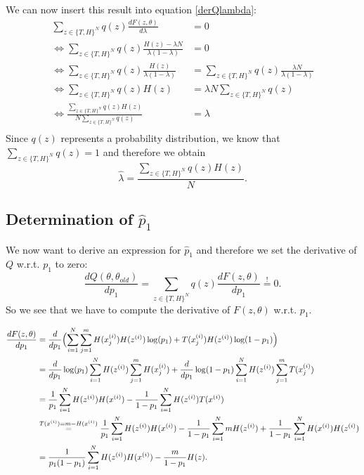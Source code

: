 \documentclass[paper=a4,fontsize=10pt,DIV11,BCOR10mm]{scrartcl}
\begin{document}
We can now insert this result into equation \ref{derQlambda}:
\begin{align*}
\sum_{z\in \{T,H\}^N} q(z) \frac{dF(z,\theta)}{d\lambda} &=0\\
\Leftrightarrow \sum_{z\in \{T,H\}^N} q(z) \frac{H(z)-\lambda N}{\lambda(1-\lambda)} &=0\\
\Leftrightarrow \sum_{z\in \{T,H\}^N} q(z) \frac{H(z)}{\lambda(1-\lambda)} &= \sum_{z\in \{T,H\}^N} q(z) \frac{\lambda N}{\lambda(1-\lambda)}\\
\Leftrightarrow \sum_{z\in \{T,H\}^N} q(z) H(z) &= \lambda N \sum_{z\in \{T,H\}^N} q(z) \\
\Leftrightarrow \frac{\sum_{z\in \{T,H\}^N} q(z) H(z)}{N \sum_{z\in \{T,H\}^N} q(z)} &= \lambda\\
\end{align*}
Since $q(z)$ represents a probability distribution, we know that $\sum_{z\in \{T,H\}^N} q(z)=1$ and therefore we obtain
\begin{equation*}
\hat \lambda = \frac{\sum_{z\in \{T,H\}^N} q(z) H(z)}{N}.
\end{equation*}

\subsection*{Determination of $\hat p_1$}

We now want to derive an expression for $\hat p_1$ and therefore we set the derivative of $Q$ w.r.t. $p_1$ to zero:
\begin{equation}\label{derQp1}
\frac{dQ(\theta,\theta_{old})}{d p_1}=\sum_{z\in \{T,H\}^N} q(z) \frac{dF(z,\theta)}{d p_1} \stackrel{!}{=}0.
\end{equation}
So we see that we have to compute the derivative of $F(z,\theta)$ w.r.t. $p_1$.

\begin{align*}
\frac{dF(z,\theta)}{d p_1} &= \frac{d}{d p_1} \Bigl ( \sum_{i=1}^N \sum_{j=1}^m  H(x_j^{(i)}) H(z^{(i)}) \log(p_1) + T(x_j^{(i)}) H(z^{(i)})\log(1-p_1) \Bigr )\\
&= \frac{d}{d p_1} \log(p_1) \sum_{i=1}^N  H(z^{(i)})\sum_{j=1}^m  H(x_j^{(i)})  + \frac{d}{d p_1} \log(1-p_1) \sum_{i=1}^N H(z^{(i)}) \sum_{j=1}^m T(x_j^{(i)}) \\
&= \frac{1}{p_1} \sum_{i=1}^N  H(z^{(i)}) H(x^{(i)}) - \frac{1}{1-p_1} \sum_{i=1}^N H(z^{(i)}) T(x^{(i)}) \\
&\stackrel{T(x^{(i)})=m-H(x^{(i)})}{=} \frac{1}{p_1} \sum_{i=1}^N  H(z^{(i)}) H(x^{(i)}) - \frac{1}{1-p_1} \sum_{i=1}^N m H(z^{(i)}) + \frac{1}{1-p_1} \sum_{i=1}^N H(x^{(i)})H(z^{(i)}) \\
&=\frac{1}{p_1(1-p_1)} \sum_{i=1}^N  H(z^{(i)}) H(x^{(i)}) - \frac{m}{1-p_1} H(z).
\end{align*}
\end{document}
